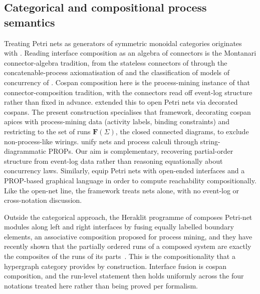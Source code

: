 \subsection{Categorical and compositional process semantics}

Treating Petri nets as generators of symmetric monoidal categories originates with
\citet{meseguerPetriNetsAre1990}. Reading interface composition as an algebra of
connectors is the Montanari connector-algebra tradition, from the stateless connectors of
\citet{bruniBasicAlgebraStateless2006} through the concatenable-process
axiomatisation of \citet{sassoneAxiomatizationAlgebraPetri1996} and the classification of
models of concurrency of \citet{sassoneModelsConcurrencyClassification1996}.
Cospan composition here is the process-mining instance of that connector-composition tradition, with
the connectors read off event-log structure rather than fixed in advance. \citet{baezOpenPetriNets2020} extended
this to open Petri nets via decorated cospans. The present construction specialises that framework,
decorating cospan apices with process-mining data (activity labels, binding constraints) and
restricting to the set of runs $\mathbf{F}(\Sigma)$, the closed connected diagrams, to exclude non-process-like
wirings. \citet{bonchiDiagrammaticAlgebraLinear2019} unify nets and process calculi through
string-diagrammatic PROPs. Our aim is complementary, recovering partial-order structure from
event-log data rather than reasoning equationally about concurrency laws.
Similarly, \citet{lechenneCompositionalFrameworkPetri2024}
equip Petri nets with open-ended interfaces and a PROP-based graphical language in order to compute
reachability compositionally. Like the open-net line, the framework treats nets alone, with no
event-log or cross-notation discussion.

Outside the categorical approach, the Heraklit programme of \citet{fettkeSystemsMiningHeraklit2022} composes
Petri-net modules along left and right interfaces by fusing equally labelled boundary elements, an
associative composition proposed for process mining, and
they have recently shown that the partially ordered runs of a composed system are exactly the
composites of the runs of its parts~\cite{fettkeCompositionalitySystemsPartially2026}. This is the
compositionality that a hypergraph category provides by construction. Interface fusion is cospan
composition, and the run-level statement then holds uniformly across the four notations treated
here rather than being proved per formalism.

